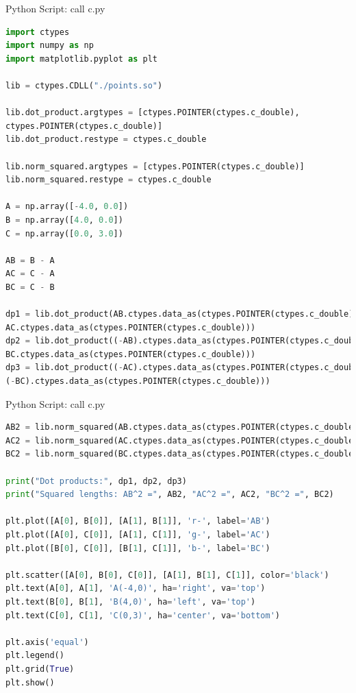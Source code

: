 \documentclass{beamer}
\numberwithin{equation}{section}
\begin{document}
\begin{frame}[fragile]{Python Script: call c.py}
\begin{lstlisting}[language=Python]
import ctypes
import numpy as np
import matplotlib.pyplot as plt

lib = ctypes.CDLL("./points.so")

lib.dot_product.argtypes = [ctypes.POINTER(ctypes.c_double),
ctypes.POINTER(ctypes.c_double)]
lib.dot_product.restype = ctypes.c_double

lib.norm_squared.argtypes = [ctypes.POINTER(ctypes.c_double)]
lib.norm_squared.restype = ctypes.c_double

A = np.array([-4.0, 0.0])
B = np.array([4.0, 0.0])
C = np.array([0.0, 3.0])

AB = B - A
AC = C - A
BC = C - B

dp1 = lib.dot_product(AB.ctypes.data_as(ctypes.POINTER(ctypes.c_double)),
AC.ctypes.data_as(ctypes.POINTER(ctypes.c_double)))
dp2 = lib.dot_product((-AB).ctypes.data_as(ctypes.POINTER(ctypes.c_double)),
BC.ctypes.data_as(ctypes.POINTER(ctypes.c_double)))
dp3 = lib.dot_product((-AC).ctypes.data_as(ctypes.POINTER(ctypes.c_double)),
(-BC).ctypes.data_as(ctypes.POINTER(ctypes.c_double)))
\end{lstlisting}
\end{frame}

\begin{frame}[fragile]{Python Script: call c.py}
\begin{lstlisting}[language=Python]
AB2 = lib.norm_squared(AB.ctypes.data_as(ctypes.POINTER(ctypes.c_double)))
AC2 = lib.norm_squared(AC.ctypes.data_as(ctypes.POINTER(ctypes.c_double)))
BC2 = lib.norm_squared(BC.ctypes.data_as(ctypes.POINTER(ctypes.c_double)))

print("Dot products:", dp1, dp2, dp3)
print("Squared lengths: AB^2 =", AB2, "AC^2 =", AC2, "BC^2 =", BC2)

plt.plot([A[0], B[0]], [A[1], B[1]], 'r-', label='AB')
plt.plot([A[0], C[0]], [A[1], C[1]], 'g-', label='AC')
plt.plot([B[0], C[0]], [B[1], C[1]], 'b-', label='BC')

plt.scatter([A[0], B[0], C[0]], [A[1], B[1], C[1]], color='black')
plt.text(A[0], A[1], 'A(-4,0)', ha='right', va='top')
plt.text(B[0], B[1], 'B(4,0)', ha='left', va='top')
plt.text(C[0], C[1], 'C(0,3)', ha='center', va='bottom')

plt.axis('equal')
plt.legend()
plt.grid(True)
plt.show()
\end{lstlisting}
\end{frame}
\end{document}
